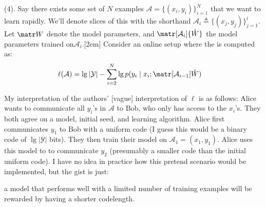 \documentclass[11pt]{article}
\begin{document}
 (4). Say there exists some set of $N$ examples $\mathcal A = \{(x_i, y_i)\}_{i=1}^N$ that we want to learn rapidly. We'll denote slices of this with the shorthand $\mathcal A_{i} \triangleq \{(x_j, y_j)\}_{j=1}^i$. Let $\matr W$ denote the model parameters, and $\matr[\mathcal A_i]{\hat W}$ the model parameters trained on$\mathcal A_i$.[2em] Consider an online setup where the  is computed as:
\begin{align}
	\ell (\mathcal A) &= \lg |\mathcal Y| - \sum_{i=2}^{N} \lg p(y_i \mid x_i ;  \matr[\mathcal A_{i-1}]{\hat W})
\end{align}

My interpretation of the authors' [vague] interpretation of $\ell$ is as follows: Alice wants to communicate all $y_i$'s in $\mathcal A$ to Bob, who only has access to the $x_i$'s. They both agree on a model, initial seed, and learning algorithm. Alice first communicates $y_1$ to Bob with a uniform code (I guess this would be a binary code of $\lg |\mathcal Y|$ bits). They then train their model on $\mathcal A_1 = (x_1, y_1)$. Alice uses this model to to communicate $y_2$ (presumably a smaller code than the initial uniform code). I have no idea in practice how this pretend scenario would be implemented, but the gist is just:
\begin{myquote}
	\textellipsis a model that performs well with a limited number of training examples will be rewarded by having a shorter codelength.
\end{myquote}
\end{document}
